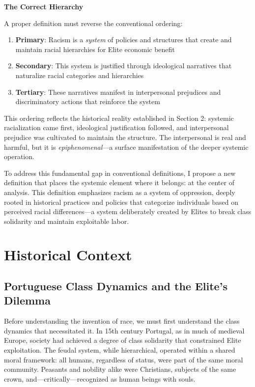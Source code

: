 \documentclass[12pt]{article}
\begin{document}
\textbf{The Correct Hierarchy}

A proper definition must reverse the conventional ordering:

\begin{enumerate}
    \item \textbf{Primary}: Racism is a \textit{system} of policies and structures that create and maintain racial hierarchies for Elite economic benefit
    \item \textbf{Secondary}: This system is justified through ideological narratives that naturalize racial categories and hierarchies
    \item \textbf{Tertiary}: These narratives manifest in interpersonal prejudices and discriminatory actions that reinforce the system
\end{enumerate}

This ordering reflects the historical reality established in Section 2: systemic racialization came first, ideological justification followed, and interpersonal prejudice was cultivated to maintain the structure. The interpersonal is real and harmful, but it is \textit{epiphenomenal}---a surface manifestation of the deeper systemic operation.

To address this fundamental gap in conventional definitions, I propose a new definition that places the systemic element where it belongs: at the center of analysis. This definition emphasizes racism as a system of oppression, deeply rooted in historical practices and policies that categorize individuals based on perceived racial differences---a system deliberately created by Elites to break class solidarity and maintain exploitable labor.

\section{Historical Context}

\subsection{Portuguese Class Dynamics and the Elite's Dilemma}

Before understanding the invention of race, we must first understand the class dynamics that necessitated it. In 15th century Portugal, as in much of medieval Europe, society had achieved a degree of class solidarity that constrained Elite exploitation. The feudal system, while hierarchical, operated within a shared moral framework: all humans, regardless of status, were part of the same moral community. Peasants and nobility alike were Christians, subjects of the same crown, and---critically---recognized as human beings with souls.
\end{document}
